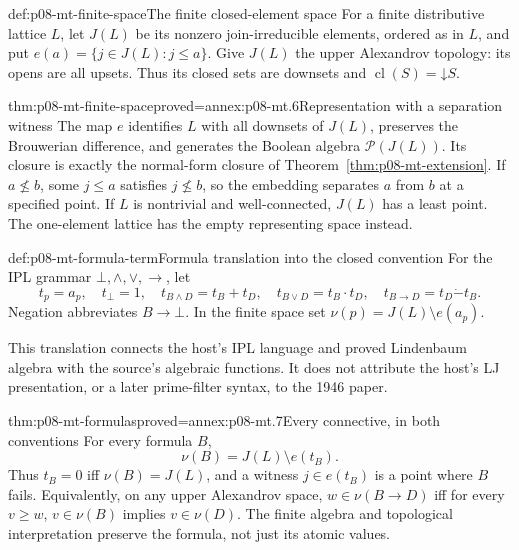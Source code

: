 \begin{hbdefinition}{def:p08-mt-finite-space}{The finite closed-element space}
For a finite distributive lattice \(L\), let \(J(L)\) be its nonzero
join-irreducible elements, ordered as in \(L\), and put
\(e(a)=\{j\in J(L):j\leq a\}\).
Give \(J(L)\) the upper Alexandrov topology: its opens are all upsets.
Thus its closed sets are downsets and
\(\operatorname{cl}(S)=\mathord{\downarrow}S\).
\end{hbdefinition}

\begin{hbtheorem}{thm:p08-mt-finite-space}{proved=annex:p08-mt.6}{Representation with a separation witness}
The map \(e\) identifies \(L\) with all downsets of \(J(L)\), preserves
the Brouwerian difference, and generates the Boolean algebra
\(\mathcal P(J(L))\). Its closure is exactly the normal-form closure of
Theorem~\ref{thm:p08-mt-extension}. If \(a\not\leq b\), some
\(j\leq a\) satisfies \(j\not\leq b\), so the embedding separates
\(a\) from \(b\) at a specified point.
If \(L\) is nontrivial and well-connected, \(J(L)\) has a least point.
The one-element lattice has the empty representing space instead.
\end{hbtheorem}

\begin{hbdefinition}{def:p08-mt-formula-term}{Formula translation into the closed convention}
For the IPL grammar \(\bot,\wedge,\vee,\to\), let
\[
 t_p=a_p,\quad t_\bot=1,\quad
 t_{B\wedge D}=t_B+t_D,\quad t_{B\vee D}=t_B\cdot t_D,
 \quad t_{B\to D}=t_D\mathbin{\dot{-}}t_B.
\]
Negation abbreviates \(B\to\bot\). In the finite space set
\(\nu(p)=J(L)\setminus e(a_p)\).
\end{hbdefinition}

This translation connects the host's IPL language and proved Lindenbaum
algebra with the source's algebraic functions. It does not attribute the
host's LJ presentation, or a later prime-filter syntax, to the 1946 paper.

\begin{hblemma}{thm:p08-mt-formulas}{proved=annex:p08-mt.7}{Every connective, in both conventions}
For every formula \(B\),
\[
 \nu(B)=J(L)\setminus e(t_B).
\]
Thus \(t_B=0\) iff \(\nu(B)=J(L)\), and a witness
\(j\in e(t_B)\) is a point where \(B\) fails.
Equivalently, on any upper Alexandrov space,
\(w\in\nu(B\to D)\) iff for every \(v\geq w\),
\(v\in\nu(B)\) implies \(v\in\nu(D)\).
The finite algebra and topological interpretation preserve the formula,
not just its atomic values.
\end{hblemma}

